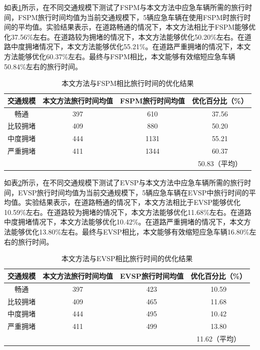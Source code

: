 如表\ref{table:travel_time_my_FSPM}所示，在不同交通规模下测试了FSPM与本文方法中应急车辆所需的旅行时间，FSPM旅行时间均值为当前交通规模下，5辆应急车辆在使用FSPM时旅行时间的平均值。实验结果表示，在道路畅通的情况下，本文方法相比于FSPM能够优化37.56\%左右。在道路较为拥堵的情况下，本文方法能够优化50.20\%左右。在道路中度拥堵情况下，本文方法能够优化55.21\%。在道路严重拥堵的情况下，本文方法能够优化60.37\%左右。最终与FSPM相比，本文能够有效缩短应急车辆50.84\%左右的旅行时间。

\begin{table}[H]
	\centering
	\caption{本文方法与FSPM相比旅行时间的优化结果}
	\label{table:travel_time_my_FSPM}
	\begin{tabular}{|c|c|c|c|}
		\hline
		交通规模 & 本文方法旅行时间均值 & FSPM旅行时间均值\cite{min} & 优化百分比（\%） \\ \hline
		畅通     & 397 & 610  & 37.56                      \\ \hline
		比较拥堵 & 409 & 880  & 50.20                      \\ \hline
		中度拥堵 & 444 & 1131 & 55.21                      \\ \hline
		严重拥堵 & 411 & 1344 & 60.37                      \\ \hline
		  &  &  & 50.83（平均） \\ \hline
	\end{tabular}
\end{table}

如表\ref{table:travel_time_my_ISPM}所示，在不同交通规模下测试了EVSP与本文方法中应急车辆所需的旅行时间，EVSP旅行时间均值为当前交通规模下，5辆应急车辆在EVSP中旅行时间的平均值。实验结果表示，在道路畅通的情况下，本文方法相比于EVSP能够优化10.59\%左右。在道路较为拥堵的情况下，本文方法能够优化11.68\%左右。在道路中度拥堵情况下，本文方法能够优化10.42\%。在道路严重拥堵的情况下，本文方法能够优化13.80\%左右。最终与EVSP相比，本文能够有效缩短应急车辆16.80\%左右的旅行时间。

\begin{table}[H]
	\centering
	\caption{本文方法与EVSP相比旅行时间的优化结果}
	\label{table:travel_time_my_ISPM}
	\begin{tabular}{|c|c|c|c|}
		\hline
		交通规模	& 本文方法旅行时间均值 & EVSP旅行时间均值\cite{qin_control_2012} & 优化百分比（\%） \\ \hline
		畅通		  & 397     & 423           & 10.59           \\ \hline
		比较拥堵	& 409     & 465           & 11.68           \\ \hline
		中度拥堵	& 444     & 495           & 10.42           \\ \hline
		严重拥堵	& 411     & 499           & 13.80           \\ \hline
		  &  &  & 11.62（平均） \\ \hline
	\end{tabular}
\end{table}

